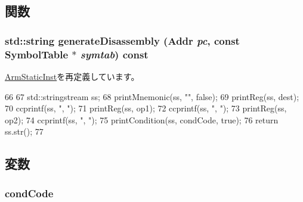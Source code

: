 \subsection{関数}
\hypertarget{classArmISA_1_1FpCondSelOp_a95d323a22a5f07e14d6b4c9385a91896}{
\subsubsection[{generateDisassembly}]{\setlength{\rightskip}{0pt plus 5cm}std::string generateDisassembly ({\bf Addr} {\em pc}, \/  const SymbolTable $\ast$ {\em symtab}) const}}
\label{classArmISA_1_1FpCondSelOp_a95d323a22a5f07e14d6b4c9385a91896}


\hyperlink{classArmISA_1_1ArmStaticInst_a95d323a22a5f07e14d6b4c9385a91896}{ArmStaticInst}を再定義しています。


\begin{DoxyCode}
66 {
67     std::stringstream ss;
68     printMnemonic(ss, "", false);
69     printReg(ss, dest);
70     ccprintf(ss, ", ");
71     printReg(ss, op1);
72     ccprintf(ss, ", ");
73     printReg(ss, op2);
74     ccprintf(ss, ", ");
75     printCondition(ss, condCode, true);
76     return ss.str();
77 }
\end{DoxyCode}


\subsection{変数}
\hypertarget{classArmISA_1_1FpCondSelOp_a273dc0fe84de8f4a9cf52aaf8dc27885}{
\subsubsection[{condCode}]{ {\bf condCode}}}
\label{classArmISA_1_1FpCondSelOp_a273dc0fe84de8f4a9cf52aaf8dc27885}


